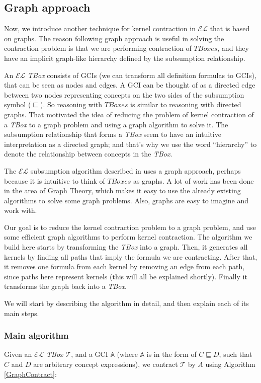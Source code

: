 \subsection{Graph approach}
Now, we introduce another technique for kernel contraction in $\mathcal{EL}$ that is based on graphs. The reason following graph approach is useful in solving the contraction problem is that we are performing contraction of $TBoxes$, and they have an implicit graph-like hierarchy defined by the subsumption relationship.

An $\mathcal{EL}$ \textit{TBox} consists of GCIs (we can transform all definition formulas to GCIs), that can be seen as nodes and edges. A GCI can be thought of as a directed edge between two nodes representing concepts on the two sides of the subsumption symbol ($\sqsubseteq$). So reasoning with $TBoxes$ is similar to reasoning with directed graphs. That motivated the idea of reducing the problem of kernel contraction of a \textit{TBox} to a graph problem and using a graph algorithm to solve it. The subsumption relationship that forms a \textit{TBox} seem to have an intuitive interpretation as a directed graph; and that's why we use the word ``hierarchy'' to denote the relationship between concepts in the \textit{TBox}.

The $\mathcal{EL}$ subsumption algorithm described in \cite{small} uses a graph approach, perhaps because it is intuitive to think of $TBoxes$ as graphs. A lot of work has been done in the area of Graph Theory, which makes it easy to use the already existing algorithms to solve some graph problems. Also, graphs are easy to imagine and work with. 

Our goal is to reduce the kernel contraction problem to a graph problem, and use some efficient graph algorithms to perform kernel contraction. The algorithm we build here starts by transforming the \textit{TBox} into a graph. Then, it generates all kernels by finding all paths that imply the formula we are contracting. After that, it removes one formula from each kernel by removing an edge from each path, since paths here represent kernels (this will all be explained shortly). Finally it transforms the graph back into a \textit{TBox}. 

We will start by describing the algorithm in detail, and then explain each of its main steps. 

\subsubsection{Main algorithm}
Given an $\mathcal{EL}$ \textit{TBox} $\mathcal{T}$, and a GCI $\mathbb{A}$ (where $\mathbb{A}$ is in the form of $C \sqsubseteq D$, such that $C$ and $D$ are arbitrary concept expressions), we contract $\mathcal{T}$ by $A$ using Algorithm \ref{GraphContract}:


